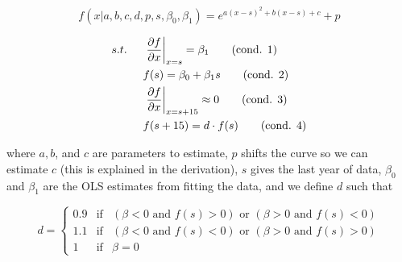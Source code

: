 \documentclass{article}
\numberwithin{equation}{subsection}
\begin{document}
\begin{appendices}
\begin{equation}
   f(x|a, b, c, d, p, s, \beta_0, \beta_1) = e^{a(x-s)^2 + b(x-s) + c} + p
\end{equation}

\begin{align*}
   s.t. \hspace{5mm} &\left.\pdv{f}{x}\right|_{x=s} = \beta_1 \tag{cond. 1} \label{c1} \\
   &f(s) = \beta_0 + \beta_1 s \tag{cond. 2} \label{c2} \\
   &\left.\pdv{f}{x}\right|_{x=s + 15} \approx 0 \tag{cond. 3} \label{c3} \\
   &f(s + 15) = d \cdot f(s) \tag{cond. 4} \label{c4}
\end{align*}

\noindent
where \(a, b\), and \(c\) are parameters to estimate, \(p\) shifts the curve so we can estimate \(c\) (this is explained in the derivation), \(s\) gives the last year of data, \(\beta_0\) and \(\beta_1\) are the OLS estimates from fitting the data, and we define \(d\) such that

\[
   d = \left\{\begin{matrix}
      0.9 & \text{if} & (\beta < 0 \text{ and } f(s) > 0) \text{ or } (\beta > 0 \text{ and } f(s) < 0) \\
      1.1 & \text{if} & (\beta < 0 \text{ and } f(s) < 0) \text{ or } (\beta > 0 \text{ and } f(s) > 0) \\
      1 & \text{if} & \beta = 0
   \end{matrix}\right.
\]


\end{appendices}
\end{document}
